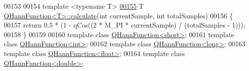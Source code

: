 \begin{DoxyCode}
00153 
00154 \textcolor{keyword}{template} <\textcolor{keyword}{typename} T>
\hypertarget{a00127_source_l00155}{}\hyperlink{a00057_a4c93ae740237871fc75e3bea81521f35}{00155} T \hyperlink{a00057_a4c93ae740237871fc75e3bea81521f35}{QHannFunction<T>::calculate}(\textcolor{keywordtype}{int} currentSample, \textcolor{keywordtype}{int} totalSamples)
00156 \{
00157     \textcolor{keywordflow}{return} 0.5 * (1 - qCos((2 * M\_PI * currentSample) / (totalSamples - 1)));
00158 \}
00159 
00160 \textcolor{keyword}{template} \textcolor{keyword}{class }\hyperlink{a00057}{QHannFunction<short>};
00161 \textcolor{keyword}{template} \textcolor{keyword}{class }\hyperlink{a00057}{QHannFunction<int>};
00162 \textcolor{keyword}{template} \textcolor{keyword}{class }\hyperlink{a00057}{QHannFunction<long>};
00163 \textcolor{keyword}{template} \textcolor{keyword}{class }\hyperlink{a00057}{QHannFunction<float>};
00164 \textcolor{keyword}{template} \textcolor{keyword}{class }\hyperlink{a00057}{QHannFunction<double>};
\end{DoxyCode}
